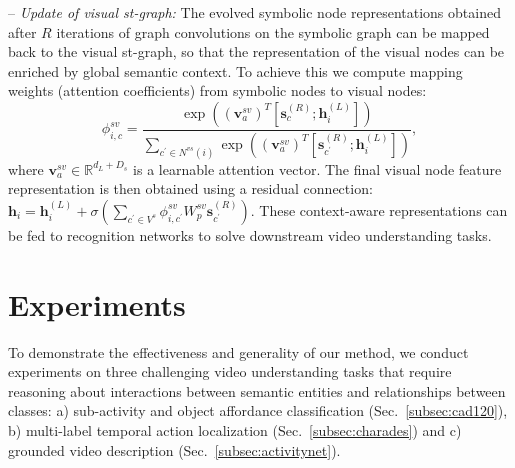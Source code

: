 \documentclass[runningheads]{llncs}
\newcommand{\R}{\mathbb{R}}
\newcommand{\h}{\mathbf{h}}
\newcommand{\s}{\mathbf{s}}
\newcommand{\mysubparagraph}[1]{\smallskip\noindent-- \emph{#1:}}
\begin{document}
\mysubparagraph{Update of visual st-graph} 
The evolved symbolic node representations obtained after $R$ iterations of 
graph convolutions on the symbolic graph can be mapped back to the visual st-graph, so that the representation of the visual nodes can be enriched by global semantic context. To achieve this we compute mapping weights (attention coefficients) from symbolic nodes to visual nodes:
\begin{equation}
\phi_{i,c}^{sv} = \frac{\exp{\left( \left(\mathbf{v}_a^{sv}\right)^T \left[\s_c^{(R)};\h_i^{(L)}\right]\right)}}{\sum_{c^\prime \in N^{vs}(i)} \exp{\left( \left(\mathbf{v}_a^{sv}\right)^T \left[\s_{c^\prime}^{(R)};\h_i^{(L)}\right]\right)}} ,
\end{equation}
where $\mathbf{v}_a^{sv} \in \R^{d_L + D_s}$ is a learnable attention vector.
The final visual node feature representation is then obtained using a residual connection: $	\h_i = \h_i^{(L)} + \sigma\left(\sum_{c^\prime \in V^s} \phi^{sv}_{i,c^\prime} W_p^{sv} \s_{c^\prime}^{(R)} \right)$. These context-aware representations can be fed to recognition networks to solve downstream video understanding tasks. 
 \section{Experiments}
\label{sec:experiments}
To demonstrate the effectiveness and generality of our method, we conduct experiments on three challenging video understanding tasks that require reasoning about interactions between semantic entities and relationships between classes: a) sub-activity and object affordance classification (Sec.~\ref{subsec:cad120}), b) multi-label temporal action localization (Sec.~\ref{subsec:charades}) and c) grounded video description (Sec.~\ref{subsec:activitynet}).
\begin{table}[t]
\caption{\textbf{Results on CAD-120~\cite{Koppula:IJRR13}} for sub-activity and object
affordance detection, measured via F1-score. Our results are averaged over five random runs, with the standard deviation reported in parentheses.}
\label{tab:cad120_sota}
\centering
{}

\end{table}
\end{document}
